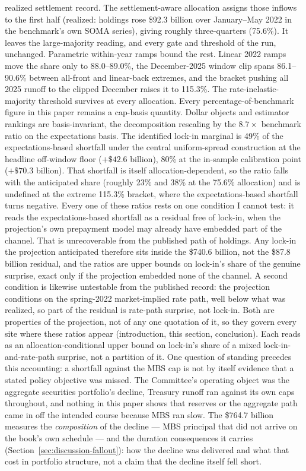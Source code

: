\documentclass[12pt]{article}
\begin{document}
realized settlement record. The settlement-aware allocation assigns those inflows to the first half (realized: holdings rose \$92.3 billion over January--May 2022 in the benchmark's own SOMA series), giving roughly three-quarters (75.6\%). It leaves the large-majority reading, and every gate and threshold of the run, unchanged. Parametric within-year ramps bound the rest. Linear 2022 ramps move the share only to 88.0--89.0\%, the December-2025 window clip spans 86.1--90.6\% between all-front and linear-back extremes, and the bracket pushing all 2025 runoff to the clipped December raises it to 115.3\%. The rate-inelastic-majority threshold survives at every allocation. Every percentage-of-benchmark figure in this paper remains a cap-basis quantity. Dollar objects and estimator rankings are basis-invariant, the decomposition rescaling by the $8.7\times$ benchmark ratio on the expectations basis. The identified lock-in marginal is 49\% of the expectations-based shortfall under the central uniform-spread construction at the headline off-window floor ($+\$42.6$ billion), 80\% at the in-sample calibration point ($+\$70.3$ billion). That shortfall is itself allocation-dependent, so the ratio falls with the anticipated share (roughly 23\% and 38\% at the 75.6\% allocation) and is undefined at the extreme 115.3\% bracket, where the expectations-based shortfall turns negative. Every one of these ratios rests on one condition I cannot test: it reads the expectations-based shortfall as a residual free of lock-in, when the projection's own prepayment model may already have embedded part of the channel. That is unrecoverable from the published path of holdings. Any lock-in the projection anticipated therefore sits inside the \$740.6 billion, not the \$87.8 billion residual, and the ratios are upper bounds on lock-in's share of the genuine surprise, exact only if the projection embedded none of the channel. A second condition is likewise untestable from the published record: the projection conditions on the spring-2022 market-implied rate path, well below what was realized, so part of the residual is rate-path surprise, not lock-in. Both are properties of the projection, not of any one quotation of it, so they govern every site where these ratios appear (introduction, this section, conclusion). Each reads as an allocation-conditional upper bound on lock-in's share of a mixed lock-in-and-rate-path surprise, not a partition of it. One question of standing precedes this accounting: a shortfall against the MBS cap is not by itself evidence that a stated policy objective was missed. The Committee's operating object was the aggregate securities portfolio's decline, Treasury runoff ran against its own caps throughout, and nothing in this paper shows that reserves or the aggregate path came in off the intended course because MBS ran slow. The \$764.7 billion measures the \emph{composition} of the decline --- MBS principal that did not arrive on the book's own schedule --- and the duration consequences it carries (Section~\ref{sec:discussion-fallout}): how the decline was delivered and what that cost in portfolio structure, not a claim that the decline itself fell short.
\end{document}
